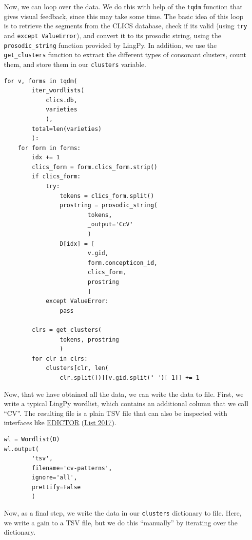 \documentclass[
  a4paper,
  14pt,
  oneside,
  tablecaptionabove
]{scrbook}
\begin{document}
Now, we can loop over the data. We do this with help of the
\lstinline!tqdm! function that gives visual feedback, since this may
take some time. The basic idea of this loop is to retrieve the segments
from the CLICS database, check if its valid (using \lstinline!try! and
\lstinline!except ValueError!), and convert it to its prosodic string,
using the \lstinline!prosodic_string! function provided by LingPy. In
addition, we use the \lstinline!get_clusters! function to extract the
different types of consonant clusters, count them, and store them in our
\lstinline!clusters! variable.

\begin{lstlisting}
for v, forms in tqdm(
        iter_wordlists(
            clics.db, 
            varieties
            ), 
        total=len(varieties)
        ):
    for form in forms:
        idx += 1
        clics_form = form.clics_form.strip()
        if clics_form:
            try:
                tokens = clics_form.split()
                prostring = prosodic_string(
                        tokens,
                        _output='CcV'
                        )
                D[idx] = [
                        v.gid, 
                        form.concepticon_id, 
                        clics_form,
                        prostring
                        ]
            except ValueError:
                pass

        clrs = get_clusters(
                tokens, prostring
                )
        for clr in clrs:
            clusters[clr, len(
                clr.split())][v.gid.split('-')[-1]] += 1
\end{lstlisting}

Now, that we have obtained all the data, we can write the data to file.
First, we write a typical LingPy wordlist, which contains an additional
column that we call \enquote{CV}. The resulting file is a plain TSV file
that can also be inspected with interfaces like
\href{http://edictor.digling.org}{EDICTOR} (\href{http://bibliography.lingpy.org?key=List2017d}{List 2017}).

\begin{lstlisting}
wl = Wordlist(D)
wl.output(
        'tsv', 
        filename='cv-patterns', 
        ignore='all', 
        prettify=False
        )
\end{lstlisting}

Now, as a final step, we write the data in our \lstinline!clusters!
dictionary to file. Here, we write a gain to a TSV file, but we do this
\enquote{manually} by iterating over the dictionary.
\end{document}
